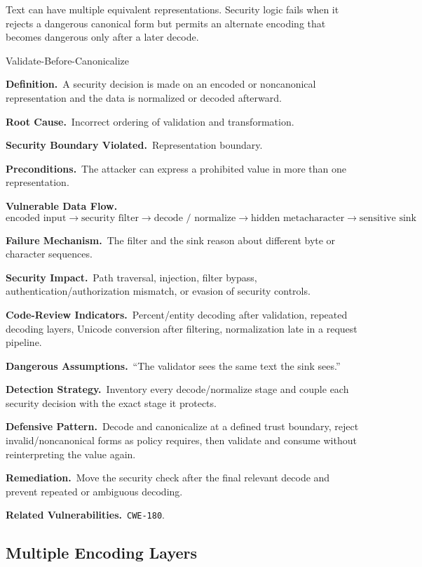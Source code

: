 \documentclass[11pt]{article}
\newcommand{\field}[1]{\par\smallskip\noindent\textbf{#1.}\ }
\newcommand{\cwe}[1]{\texttt{#1}}
\begin{document}
Text can have multiple equivalent representations. Security logic fails when it rejects a dangerous canonical form but permits an alternate encoding that becomes dangerous only after a later decode.

\begin{catalogbox}{Validate-Before-Canonicalize}
\field{Definition}A security decision is made on an encoded or noncanonical representation and the data is normalized or decoded afterward.

\field{Root Cause}Incorrect ordering of validation and transformation.

\field{Security Boundary Violated}Representation boundary.

\field{Preconditions}The attacker can express a prohibited value in more than one representation.

\field{Vulnerable Data Flow}
\[
\text{encoded input} \rightarrow
\text{security filter} \rightarrow
\text{decode / normalize} \rightarrow
\text{hidden metacharacter} \rightarrow
\text{sensitive sink}
\]

\field{Failure Mechanism}The filter and the sink reason about different byte or character sequences.

\field{Security Impact}Path traversal, injection, filter bypass, authentication/authorization mismatch, or evasion of security controls.

\field{Code-Review Indicators}Percent/entity decoding after validation, repeated decoding layers, Unicode conversion after filtering, normalization late in a request pipeline.

\field{Dangerous Assumptions}``The validator sees the same text the sink sees.''

\field{Detection Strategy}Inventory every decode/normalize stage and couple each security decision with the exact stage it protects.

\field{Defensive Pattern}Decode and canonicalize at a defined trust boundary, reject invalid/noncanonical forms as policy requires, then validate and consume without reinterpreting the value again.

\field{Remediation}Move the security check after the final relevant decode and prevent repeated or ambiguous decoding.

\field{Related Vulnerabilities}\cwe{CWE-180}.
\end{catalogbox}

\subsection{Multiple Encoding Layers}
\end{document}
